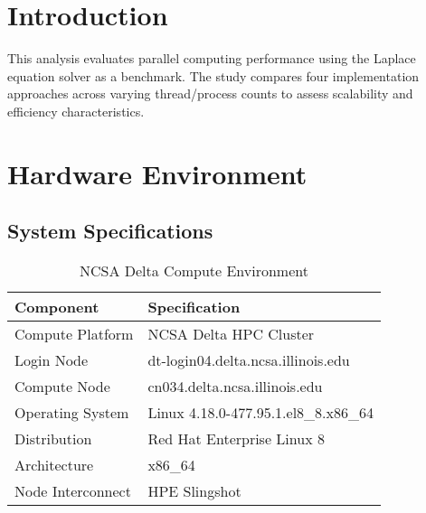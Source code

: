\documentclass[11pt]{article}
\begin{document}






%








\section{Introduction}
This analysis evaluates parallel computing performance using the Laplace equation solver as a benchmark. The study compares four implementation approaches across varying thread/process counts to assess scalability and efficiency characteristics.

\section{Hardware Environment}

\subsection{System Specifications}

\begin{table}[H]
\centering
\caption{NCSA Delta Compute Environment}
\label{tab:system_specs}
\begin{tabular}{@{}ll@{}}
\hline
\textbf{Component} & \textbf{Specification} \\
\hline
Compute Platform & NCSA Delta HPC Cluster \\
Login Node & dt-login04.delta.ncsa.illinois.edu \\
Compute Node & cn034.delta.ncsa.illinois.edu \\
Operating System & Linux 4.18.0-477.95.1.el8\_8.x86\_64 \\
Distribution & Red Hat Enterprise Linux 8 \\
Architecture & x86\_64 \\
Node Interconnect & HPE Slingshot \\
\hline
\end{tabular}
\end{table}
\end{document}

